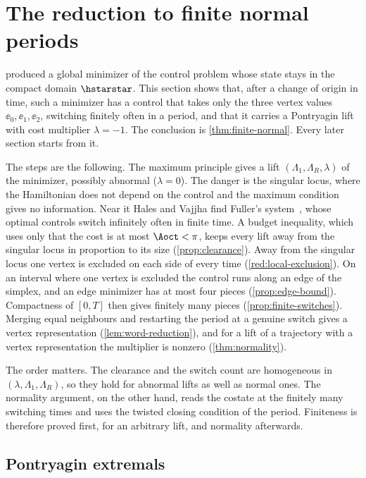 \section{The reduction to finite normal periods}\label{sec:reduction}

 produced a global minimizer of the control problem whose state stays in the
compact domain $\hstarstar$. This section shows that, after a change of origin in time, such a
minimizer has a control that takes only the three vertex values $\ee_0,\ee_1,\ee_2$, switching
finitely often in a period, and that it carries a Pontryagin lift with cost multiplier
$\lambda=-1$. The conclusion is \cref{thm:finite-normal}. Every later section starts from it.

The steps are the following. The maximum principle gives a lift $(\Lambda_1,\Lambda_R,\lambda)$ of
the minimizer, possibly abnormal ($\lambda=0$). The danger is the singular locus, where the
Hamiltonian does not depend on the control and the maximum condition gives no information. Near it
Hales and Vajjha find Fuller's system~\cite{HalesVajjha2024,Fuller1963}, whose optimal controls
switch infinitely often in finite time. A budget inequality, which uses only that the cost is at
most $\Aoct<\pi$, keeps every lift away from the singular locus in proportion to its size
(\cref{prop:clearance}). Away from the singular locus one vertex is excluded on each side of every
time (\cref{red:local-exclusion}). On an interval where one vertex is excluded the control runs
along an edge of the simplex, and an edge minimizer has at most four pieces
(\cref{prop:edge-bound}). Compactness of $[0,T]$ then gives finitely many pieces
(\cref{prop:finite-switches}). Merging equal neighbours and restarting the period at a genuine
switch gives a vertex representation (\cref{lem:word-reduction}), and for a lift of a trajectory
with a vertex representation the multiplier is nonzero (\cref{thm:normality}).

The order matters. The clearance and the switch count are homogeneous in
$(\lambda,\Lambda_1,\Lambda_R)$, so they hold for abnormal lifts as well as normal ones. The
normality argument, on the other hand, reads the costate at the finitely many switching times
and uses the twisted closing condition of the period. Finiteness is therefore proved first, for an
arbitrary lift, and normality afterwards.

\subsection{Pontryagin extremals}\label{red:extremals}

